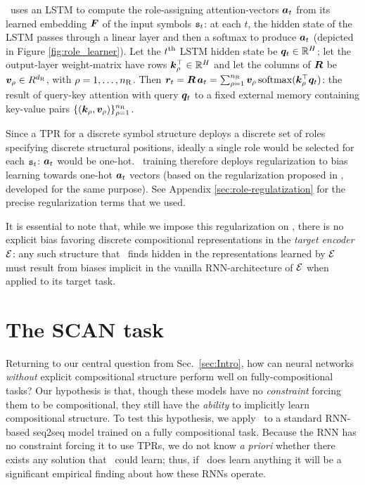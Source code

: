 \RLN\ uses an LSTM \citep{Hochreiter:1997:LSM:1246443.1246450} to compute the role-assigning attention-vectors ${\bm{a}}_t$ from its learned embedding ${\bm{F}}$ of the input symbols ${\mathtt{s}}_t$: at each $t$, the hidden state of the LSTM passes through a linear layer and then a softmax to produce ${\bm{a}}_t$ (depicted in Figure \ref{fig:role_learner}). Let the $t^{{\mathrm{th}}}$ LSTM hidden state be ${\bm{q}}_t \in \mathbb{R}^H$; let the output-layer weight-matrix have rows ${\bm{k}}_\rho^\top \in \mathbb{R}^H$ and let the columns of ${\bm{R}}$ be ${\bm{v}}_\rho \in R^{d_{\mathrm{R}}}$, with $\rho = 1,\dots,n_{\mathrm{R}}$. Then ${\bm{r}}_t = {\bm{R}}\, {\bm{a}}_t = \sum_{\rho=1}^{n_{\mathrm{R}}} {\bm{v}}_\rho\, \mathrm{softmax} ( {\bm{k}}_\rho^\top {\bm{q}}_t )$: the result of query-key attention  \citep[e.g.,][]{vaswani2017attention} with query ${\bm{q}}_t$ to a fixed external memory containing key-value pairs $\{ ( {\bm{k}}_\rho, {\bm{v}}_\rho ) \}_{\rho=1}^{n_{\mathrm{R}}}$.

Since a TPR for a discrete symbol structure deploys a discrete set of roles specifying discrete structural positions, ideally a single role would be selected for each ${\mathtt{s}}_t$: ${\bm{a}}_t$ would be one-hot.
\RLN\ training therefore deploys regularization to bias learning towards one-hot ${\bm{a}}_t$ vectors (based on the regularization proposed in \citet{palangi}, developed for the same purpose). See Appendix \ref{sec:role-regulatization} for the precise regularization terms that we used.

It is essential to note that, while we impose this regularization on \RLN, there is no explicit bias favoring discrete compositional representations in the \textit{target encoder} ${\mathcal{E}}$: any such structure that \RLN\ finds hidden in the representations learned by ${\mathcal{E}}$ must result from biases implicit in the vanilla RNN-architecture of ${\mathcal{E}}$ when applied to its target task.

\section{The SCAN task} \label{sec:SCAN}

Returning to our central question from Sec.~\ref{sec:Intro}, how can neural networks \textit{without} explicit compositional structure perform well on fully-compositional tasks? 
Our hypothesis is that, though these models have no \textit{constraint} forcing them to be compositional, they still have the \textit{ability} to implicitly learn compositional structure.
To test this hypothesis, we apply \RLN\ to a standard RNN-based seq2seq model \citep{sutskever2014sequence} trained on a fully compositional task. Because the RNN has no constraint forcing it to use TPRs, we do not know \textit{a priori} whether there exists any solution that \RLN\ could learn; thus, if \RLN\ does learn anything it will be a significant empirical finding about how these RNNs operate.

